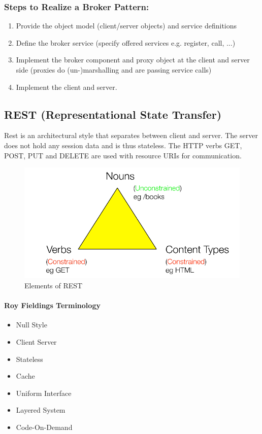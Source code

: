 \subsubsection*{Steps to Realize a Broker Pattern:}
\begin{enumerate}
  \item Provide the object model (client/server objects) and service definitions
  \item Define the broker service (specify offered services e.g. register, call, ...)
  \item Implement the broker component and proxy object at the client and server side (proxies do \hbox{(un-)marshalling} and are passing service calls)
  \item Implement the client and server.
\end{enumerate}
\newpage

\subsection{REST (Representational State Transfer)}
Rest is an architectural style that separates between client and server.
The server does not hold any session data and is thus stateless.
The HTTP verbs GET, POST, PUT and DELETE are used with resource URIs for communication.
\begin{figure}[H]
  \centering
  \includegraphics[width=.85\linewidth]{images/patttern_rest.png}
  \caption{Elements of REST}
\end{figure}
\paragraph{Roy Fieldings Terminology}
\begin{itemize}
  \item Null Style
  \item Client Server
  \item Stateless
  \item Cache
  \item Uniform Interface
  \item Layered System
  \item Code-On-Demand
\end{itemize}
\newpage
